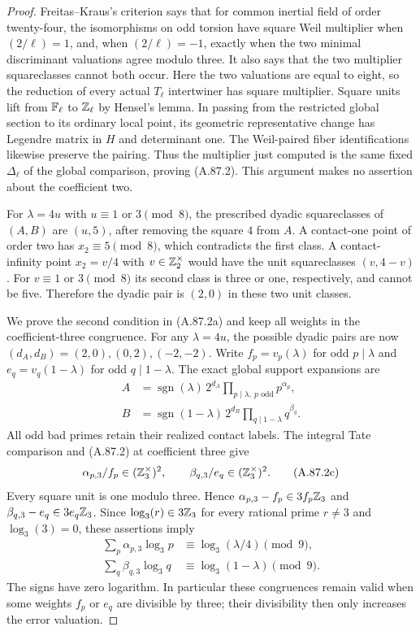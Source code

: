 \begin{proof}
Freitas--Kraus's criterion
\cite[Theorem~7, with the numbering of arXiv v5]{LegFreitasKraus2022}
says that for common inertial field of order twenty-four,
the isomorphisms on odd torsion have square Weil
multiplier when $(2/\ell)=1$, and, when
$(2/\ell)=-1$, exactly when the two minimal discriminant
valuations agree modulo three.  It also says that the
two multiplier squareclasses cannot both occur.
Here the two valuations are equal to eight, so the
reduction of every actual $T_\ell$ intertwiner has square
multiplier.  Square units lift from $\mathbb F_\ell$ to
$\mathbb Z_\ell$ by Hensel's lemma.
In passing from the restricted global section to its
ordinary local point, its geometric representative
change has Legendre matrix in $H$ and determinant one.
The Weil-paired fiber identifications likewise preserve
the pairing.  Thus the multiplier just computed is
the same fixed $\Delta_\ell$ of the global comparison,
proving (A.87.2).  This argument makes no assertion
about the coefficient two.

For $\lambda=4u$ with $u\equiv1$ or $3\pmod8$,
the prescribed dyadic squareclasses of $(A,B)$ are
$(u,5)$, after removing the square $4$ from $A$.
A contact-one point of order two has $x_2\equiv5\pmod8$,
which contradicts the first class.
A contact-infinity point $x_2=v/4$ with $v\in\mathbb Z_2^\times$
would have the unit squareclasses $(v,4-v)$.
For $v\equiv1$ or $3\pmod8$ its second class is three
or one, respectively, and cannot be five.
Therefore the dyadic pair is $(2,0)$ in these two unit classes.

We prove the second condition in (A.87.2a) and keep all
weights in the coefficient-three congruence.
For any $\lambda=4u$, the possible dyadic pairs are now
$(d_A,d_B)=(2,0),(0,2),(-2,-2)$.
Write $f_p=v_p(\lambda)$ for odd $p\mid\lambda$ and
$e_q=v_q(1-\lambda)$ for odd $q\mid1-\lambda$.
The exact global support expansions are
\[
 \begin{aligned}
 A&=\operatorname{sgn}(\lambda)\,
                    2^{d_A}\prod_{p\mid\lambda,\ p\text{ odd}}p^{\alpha_p},\\
 B&=\operatorname{sgn}(1-\lambda)\,
                    2^{d_B}\prod_{q\mid1-\lambda}q^{\beta_q}.
 \end{aligned}
\tag{A.87.2b}
\]
All odd bad primes retain their realized contact labels.
The integral Tate comparison and (A.87.2) at coefficient
three give
\[
 \alpha_{p,3}/f_p\in(\mathbb Z_3^\times)^2,
       \qquad \beta_{q,3}/e_q\in(\mathbb Z_3^\times)^2.
\tag{A.87.2c}
\]
Every square unit is one modulo three.  Hence
$\alpha_{p,3}-f_p\in3f_p\mathbb Z_3$ and
$\beta_{q,3}-e_q\in3e_q\mathbb Z_3$.
Since $\log_3(r)\in3\mathbb Z_3$ for every rational prime
$r\ne3$ and $\log_3(3)=0$, these assertions imply
\[
 \begin{aligned}
 \sum_p\alpha_{p,3}\log_3p
                      &\equiv\log_3(\lambda/4)\pmod9,\\
 \sum_q\beta_{q,3}\log_3q
                      &\equiv\log_3(1-\lambda)\pmod9.
 \end{aligned}
\tag{A.87.2d}
\]
The signs have zero logarithm.  In particular these
congruences remain valid when some weights $f_p$ or
$e_q$ are divisible by three; their divisibility then
only increases the error valuation.


\end{proof}
